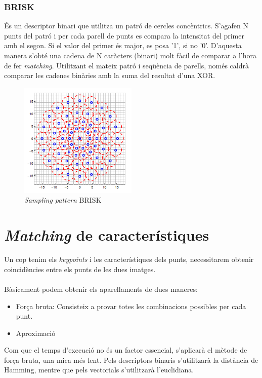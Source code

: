 	\subsubsection{BRISK}
	És un descriptor binari que utilitza un patró de cercles concèntrics. S'agafen N punts del patró i per cada parell de punts es compara la intensitat del primer amb el segon. Si el valor del primer és
	major, es posa '1', si no '0'. D'aquesta manera s'obté una cadena de N caràcters (binari) molt fàcil de comparar a l'hora de fer \textit{matching}. Utilitzant el mateix patró i seqüència de parells, només caldrà
	comparar les cadenes binàries amb la suma del resultat d'una XOR.
	\begin{figure}[H]
		\centering
		\includegraphics[width=0.5\textwidth]{images/brisk}
		\caption{\textit{Sampling pattern} BRISK}
	\end{figure}

\section{\textit{Matching} de característiques}

	Un cop tenim els \textit{keypoints} i les característiques dels punts, necessitarem obtenir coincidències entre els punts de les dues imatges.\\\\
	Bàsicament podem obtenir els aparellaments de dues maneres:\\
	\begin{itemize}	
		\item{Força bruta: Consisteix a provar totes les combinacions possibles per cada punt.}
		\item{Aproximació\\}
	\end{itemize}
	Com que el temps d'execució no és un factor essencial, s'aplicarà el mètode de força bruta, una mica més lent. Pels descriptors binaris s'utilitzarà la distància de Hamming, mentre que pels vectorials
	s'utilitzarà l'euclidiana.\\

